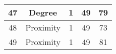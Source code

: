 \documentclass[results.tex]{subfiles}
\begin{document}
\begin{center}
\begin{tabular}{| c || c | c | c | c |}
            \hline
            47                      & Degree                       & 1                      & 49                      & 79                   \\
            \hline
            48                      & Proximity                    & 1                      & 49                      & 73                   \\
            \hline
            49                      & Proximity                    & 1                      & 49                      & 81                   \\
            \hline
        \end{tabular}
    \end{center}
\end{document}
